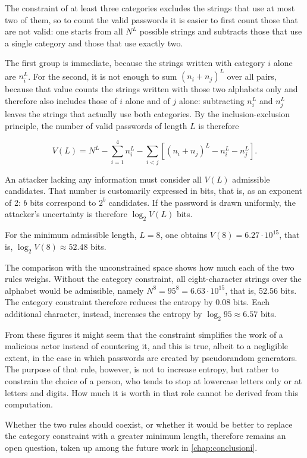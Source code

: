 The constraint of at least three categories excludes the strings that use at most two of them, so to count the
valid passwords it is easier to first count those that are not valid: one starts from all $N^L$ possible
strings and subtracts those that use a single category and those that use exactly two.

The first group is immediate, because the strings written with category $i$ alone are $n_i^L$. For
the second, it is not enough to sum $(n_i + n_j)^L$ over all pairs, because that value counts the strings
written with those two alphabets only and therefore also includes those of $i$ alone and of $j$ alone:
subtracting $n_i^L$ and $n_j^L$ leaves the strings that actually use both categories. By the
inclusion-exclusion principle, the number of valid passwords of length $L$ is therefore

\[
V(L) = N^L - \sum_{i=1}^{4} n_i^L
       - \sum_{i<j} \left[ (n_i + n_j)^L - n_i^L - n_j^L \right].
\]

An attacker lacking any information must consider all $V(L)$ admissible candidates.
That number is customarily expressed in bits, that is, as an exponent of 2: $b$ bits correspond to $2^b$
candidates. If the password is drawn uniformly, the attacker's uncertainty is therefore
$\log_2 V(L)$ bits.

For the minimum admissible length, $L = 8$, one obtains $V(8) = 6.27 \cdot 10^{15}$, that is,
$\log_2 V(8) \approx 52.48$ bits.

The comparison with the unconstrained space shows how much each of the two rules weighs. Without the
category constraint, all eight-character strings over the alphabet would be admissible, namely
$N^8 = 95^8 = 6.63 \cdot 10^{15}$, that is, 52.56 bits. The category constraint therefore reduces the entropy by 0.08 bits.
Each additional character, instead, increases the entropy by $\log_2 95 \approx 6.57$ bits.

From these figures it might seem that the constraint simplifies the work of a malicious actor instead
of countering it, and this is true, albeit to a negligible extent, in the case in which passwords are created by
pseudorandom generators.
The purpose of that rule, however, is not to increase entropy, but rather to constrain the choice of
a person, who tends to stop at lowercase letters only or at letters and digits. How much it is worth in that
role cannot be derived from this computation.

Whether the two rules should coexist, or whether it would be better to replace the category constraint with a
greater minimum length, therefore remains an open question, taken up among the future work in
\autoref{chap:conclusioni}.


